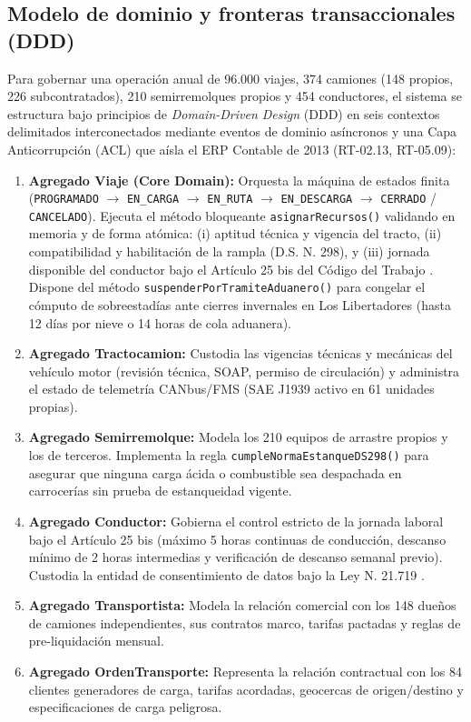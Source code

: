 \subsection{Modelo de dominio y fronteras transaccionales (DDD)}

Para gobernar una operación anual de 96.000 viajes, 374 camiones (148 propios, 226 subcontratados), 210 semirremolques propios y 454 conductores, el sistema se estructura bajo principios de \textit{Domain-Driven Design} (DDD) en seis contextos delimitados interconectados mediante eventos de dominio asíncronos y una Capa Anticorrupción (ACL) que aísla el ERP Contable de 2013 (RT-02.13, RT-05.09):

\begin{enumerate}
    \item \textbf{Agregado Viaje (Core Domain):} Orquesta la máquina de estados finita (\texttt{PROGRAMADO} $\to$ \texttt{EN\_CARGA} $\to$ \texttt{EN\_RUTA} $\to$ \texttt{EN\_DESCARGA} $\to$ \texttt{CERRADO} / \texttt{CANCELADO}). Ejecuta el método bloqueante \texttt{asignarRecursos()} validando en memoria y de forma atómica: (i) aptitud técnica y vigencia del tracto, (ii) compatibilidad y habilitación de la rampla (D.S. N.\textordmasculine{} 298), y (iii) jornada disponible del conductor bajo el Artículo 25 bis del Código del Trabajo \parencite{codigo_trabajo_25bis}. Dispone del método \texttt{suspenderPorTramiteAduanero()} para congelar el cómputo de sobreestadías ante cierres invernales en Los Libertadores (hasta 12 días por nieve o 14 horas de cola aduanera).
    \item \textbf{Agregado Tractocamion:} Custodia las vigencias técnicas y mecánicas del vehículo motor (revisión técnica, SOAP, permiso de circulación) y administra el estado de telemetría CANbus/FMS (SAE J1939 activo en 61 unidades propias).
    \item \textbf{Agregado Semirremolque:} Modela los 210 equipos de arrastre propios y los de terceros. Implementa la regla \texttt{cumpleNormaEstanqueDS298()} para asegurar que ninguna carga ácida o combustible sea despachada en carrocerías sin prueba de estanqueidad vigente.
    \item \textbf{Agregado Conductor:} Gobierna el control estricto de la jornada laboral bajo el Artículo 25 bis (máximo 5 horas continuas de conducción, descanso mínimo de 2 horas intermedias y verificación de descanso semanal previo). Custodia la entidad de consentimiento de datos bajo la Ley N.\textordmasculine{} 21.719 \parencite{ley21719}.
    \item \textbf{Agregado Transportista:} Modela la relación comercial con los 148 dueños de camiones independientes, sus contratos marco, tarifas pactadas y reglas de pre-liquidación mensual.
    \item \textbf{Agregado OrdenTransporte:} Representa la relación contractual con los 84 clientes generadores de carga, tarifas acordadas, geocercas de origen/destino y especificaciones de carga peligrosa.
\end{enumerate}

